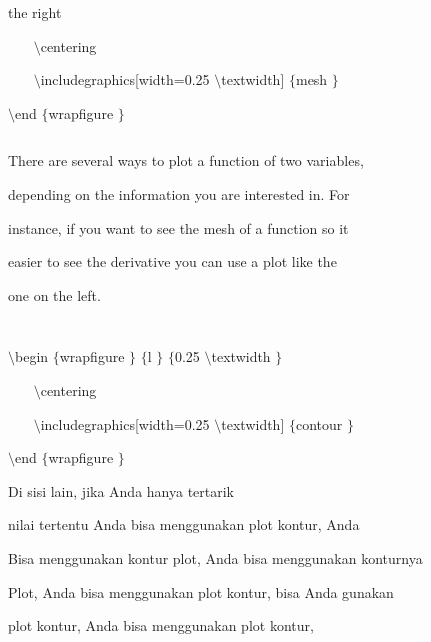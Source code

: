 \vspace{12pt}
\noindent 
the right \par
\vspace{12pt}
\noindent 
~~~  $  \setminus $centering \par
\vspace{12pt}
\noindent 
~~~  $  \setminus $includegraphics[width=0.25 $  \setminus $textwidth] $  \{  $mesh $  \}  $ \par
\vspace{12pt}
\noindent 
 $  \setminus $end $  \{  $wrapfigure $  \}  $ \par
\noindent 
 $  $ \par
\noindent 
There are several ways to plot a function of two variables,  \par
\noindent 
depending on the information you are interested in. For  \par
\noindent 
instance, if you want to see the mesh of a function so it  \par
\noindent 
easier to see the derivative you can use a plot like the  \par
\noindent 
one on the left. \par
\noindent 
 $  $ \par
\noindent 
 $  $ \par
\noindent 
 $  \setminus $begin $  \{  $wrapfigure $  \}  $ $  \{  $l $  \}  $ $  \{  $0.25 $  \setminus $textwidth $  \}  $ \par
\vspace{12pt}
\noindent 
~~~  $  \setminus $centering \par
\vspace{12pt}
\noindent 
~~~  $  \setminus $includegraphics[width=0.25 $  \setminus $textwidth] $  \{  $contour $  \}  $ \par
\vspace{12pt}
\noindent 
 $  \setminus $end $  \{  $wrapfigure $  \}  $ \par
\vspace{22pt}
\noindent 
Di sisi lain, jika Anda hanya tertarik \par
\noindent 
nilai tertentu Anda bisa menggunakan plot kontur, Anda \par
\noindent 
Bisa menggunakan kontur plot, Anda bisa menggunakan konturnya \par
\noindent 
Plot, Anda bisa menggunakan plot kontur, bisa Anda gunakan \par
\noindent 
plot kontur, Anda bisa menggunakan plot kontur, \par
